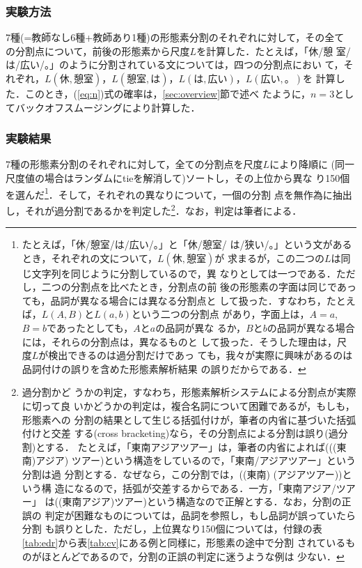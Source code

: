 \subsubsection*{実験方法}

7種(=教師なし6種+教師あり1種)の形態素分割のそれぞれに対して，その全て
の分割点について，前後の形態素から尺度$L$を計算した．たとえば，「休/憩
室/は/広い/。」のように分割されている文については，四つの分割点におい
て，それぞれ，$L(休,憩室)$，$L(憩室,は)$，$L(は,広い)$，$L(広い,。)$を
計算した．このとき，(\ref{eq:n})式の確率は，\ref{sec:overview}節で述べ
たように，$n=3$としてバックオフスムージングにより計算した．

\subsubsection*{実験結果}

7種の形態素分割のそれぞれに対して，全ての分割点を尺度$L$により降順に
(同一尺度値の場合はランダムにtieを解消して)ソートし，その上位から異な
り150個を選んだ\footnote{たとえば，「休/憩室/は/広い/。」と「休/憩室/
  は/狭い/。」という文があるとき，それぞれの文について，$L(休,憩室)$が
  求まるが，この二つの$L$は同じ文字列を同じように分割しているので，異
  なりとしては一つである．ただし，二つの分割点を比べたとき，分割点の前
  後の形態素の字面は同じであっても，品詞が異なる場合には異なる分割点と
  して扱った．すなわち，たとえば，$L(A,B)$と$L(a,b)$という二つの分割点
  があり，字面上は，$A=a$,$B=b$であったとしても，$A$と$a$の品詞が異な
  るか，$B$と$b$の品詞が異なる場合には，それらの分割点は，異なるものと
  して扱った．そうした理由は，尺度$L$が検出できるのは過分割だけであっ
  ても，我々が実際に興味があるのは品詞付けの誤りを含めた形態素解析結果
  の誤りだからである．}．そして，それぞれの異なりについて，一個の分割
点を無作為に抽出し，それが過分割であるかを判定した\footnote{過分割かど
  うかの判定，すなわち，形態素解析システムによる分割点が実際に切って良
  いかどうかの判定は，複合名詞について困難であるが，もしも，形態素への
  分割の結果として生じる括弧付けが，筆者の内省に基づいた括弧付けと交差
  する(cross bracketing)なら，その分割点による分割は誤り(過分割)とする．
  たとえば，「東南アジアツアー」は，筆者の内省によれば(((東南)アジア)
  ツアー)という構造をしているので，「東南/アジアツアー」という分割は過
  分割とする．なぜなら，この分割では，((東南) (アジアツアー))という構
  造になるので，括弧が交差するからである．一方，「東南アジア/ツアー」
  は((東南アジア)ツアー)という構造なので正解とする．なお，分割の正誤の
  判定が困難なものについては，品詞を参照し，もし品詞が誤っていたら分割
  も誤りとした．ただし，上位異なり150個については，付録の表
  \ref{tab:edr}から表\ref{tab:cv}にある例と同様に，形態素の途中で分割
  されているものがほとんどであるので，分割の正誤の判定に迷うような例は
  少ない．}．なお，判定は筆者による．

